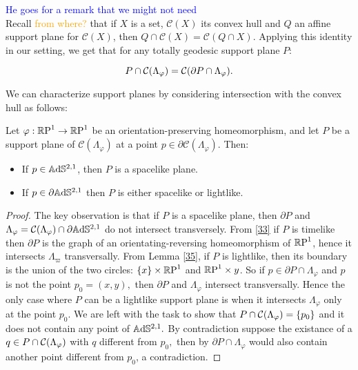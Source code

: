 \textcolor{blue}{He goes for a remark that we might not need}\\

Recall \textcolor{orange}{from where?} that if $X$ is a set, $\mathcal{C}(X)$ its convex hull and $Q$ an affine support plane for $\mathcal{C}(X)$, then $Q\cap\mathcal{C}(X)=\mathcal{C}(Q\cap X).$ Applying this identity in our setting, we get that for any totally geodesic support plane $P$: 

\begin{equation}\label{suplane}
    P\cap\CF=\mathcal{C}(\partial P\cap\Lambda_\varphi).
\end{equation}
    
We can characterize support planes by considering intersection with the convex hull as follows: 

\begin{proposition}\label{supportinho}
    Let $\varphi:\S\to\S$ be an orientation-preserving homeomorphism, and let $P$ be a support plane of $\mathcal{C}(\Lambda_\varphi)$ at a point $p\in\partial\mathcal{C}(\Lambda_\varphi).$ Then:
    \begin{itemize}
        \item If $p\in\A^{2,1}$, then $P$ is a spacelike plane. 
        \item If $p\in\partial\A^{2,1}$ then $P$ is either spacelike or lightlike.
    \end{itemize}
\end{proposition}
\begin{proof}
    The key observation is that if $P$ is a spacelike plane, then $\partial P$ and $\Lambda_\varphi=\CF\cap\partial\A^{2,1}$ do not intersect transversely. From \ref{33} if $P$ is timelike then $\partial P$ is the graph of an orientating-reversing homeomorphism of $\S$, hence it intersects $\Lambda_\varpi$ transversally. From Lemma \ref{35}, if $P$ is lightlike, then its boundary is the union of the two circles: $\{x\}\times\S$ and $\S\times{y}$. So if $p\in\partial P\cap\Lambda_\varphi$ and $p$ is not the point $p_0=(x,y),$ then $\partial P$ and $\Lambda_\varphi$ intersect transversally. Hence the only case where $P$ can be a lightlike support plane is when it intersects $\Lambda_\varphi$ only at the point $p_0.$ We are left with the task to show that $P\cap\CF=\{p_0\}$ and it does not contain any point of $\A^{2,1}.$ By contradiction suppose the existance of a $q\in P\cap\CF$ with $q$ different from $p_0,$ then by  $\partial P\cap\Lambda_\varphi$ would also contain another point different from $p_0$, a contradiction.
\end{proof}


